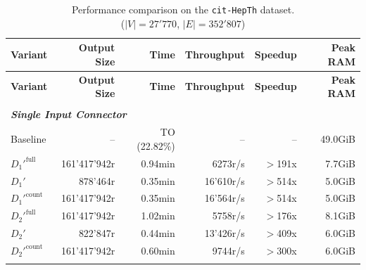 \begin{longtable}{lrrrrr}
    
    \caption[cit-HepTh Performance Comparison]{Performance comparison on the \texttt{cit-HepTh} dataset. \\ ($|V| = 27'770$, $|E| = 352'807$)}
    \label{tab:results_ablation_cit-HepTh} \\

    \toprule
    \textbf{Variant}      & \textbf{Output Size}  & \textbf{Time}       & \textbf{Throughput}   & \textbf{Speedup}  & \textbf{Peak RAM} \\
    \midrule
    \endfirsthead 

    \toprule
    \textbf{Variant}      & \textbf{Output Size}  & \textbf{Time}       & \textbf{Throughput}   & \textbf{Speedup}  & \textbf{Peak RAM} \\
    \midrule
    \endhead 

    \bottomrule
    \endfoot  

    \endlastfoot 

    \multicolumn{6}{l}{\textit{Cyclic Query 1}} \\
    \midrule
    \multicolumn{6}{l}{\textit{\textbf{Single Input Connector}}} \\
    \nopagebreak
    Baseline              &  --                   &  TO (22.82\%)   &  --                  & --                & 49.0GiB   \\
    $D_1'^{\text{full}}$   &  161'417'942r         &  0.94min        &  6273r/s             & $>$191x           & 7.7GiB    \\
    \quad $D_1'$           &  878'464r             &  0.35min        &  16'610r/s           & $>$514x           & 5.0GiB    \\
    $D_1'^{\text{count}}$  &  161'417'942r         &  0.35min        &  16'564r/s           & $>$514x           & 5.0GiB    \\
    $D_2'^{\text{full}}$   &  161'417'942r         &  1.02min        &  5758r/s             & $>$176x           & 8.1GiB    \\
    \quad $D_2'$           &  822'847r             &  0.44min        &  13'426r/s           & $>$409x           & 6.0GiB    \\
    $D_2'^{\text{count}}$  &  161'417'942r         &  0.60min        &  9744r/s             & $>$300x           & 6.0GiB    \\
    \addlinespace


\end{longtable}

